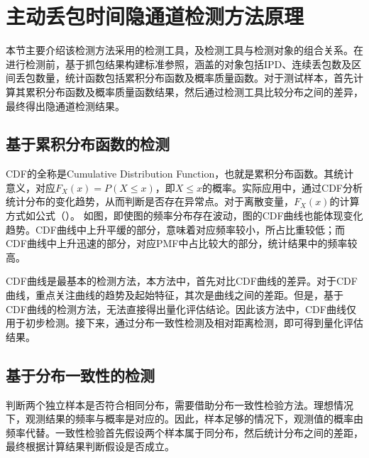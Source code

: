 \section{主动丢包时间隐通道检测方法原理}
\label{chap:analyze:statistical}

本节主要介绍该检测方法采用的检测工具，及检测工具与检测对象的组合关系。在进行检测前，基于抓包结果构建标准参照，涵盖的对象包括IPD、连续丢包数及区间丢包数量，统计函数包括累积分布函数及概率质量函数。对于测试样本，首先计算其累积分布函数及概率质量函数结果，然后通过检测工具比较分布之间的差异，最终得出隐通道检测结果。

\subsection{基于累积分布函数的检测}
\label{chap:analyze:statistical:cdf}

CDF的全称是Cumulative Distribution Function，也就是累积分布函数。其统计意义，对应$F_{X}(x)=P (X\leq x)$，即$X\leq x$的概率。实际应用中，通过CDF分析统计分布的变化趋势，从而判断是否存在异常点。对于离散变量，$F_{X}(x)$的计算方式如公式（）。
如图，即使图的频率分布存在波动，图的CDF曲线也能体现变化趋势。CDF曲线中上升平缓的部分，意味着对应频率较小，所占比重较低；而CDF曲线中上升迅速的部分，对应PMF中占比较大的部分，统计结果中的频率较高。

CDF曲线是最基本的检测方法，本方法中，首先对比CDF曲线的差异。对于CDF曲线，重点关注曲线的趋势及起始特征，其次是曲线之间的差距。但是，基于CDF曲线的检测方法，无法直接得出量化评估结论。因此该方法中，CDF曲线仅用于初步检测。接下来，通过分布一致性检测及相对距离检测，即可得到量化评估结果。

\subsection{基于分布一致性的检测}
\label{chap:analyze:statistical:test}

判断两个独立样本是否符合相同分布，需要借助分布一致性检验方法。理想情况下，观测结果的频率与概率是对应的。因此，样本足够的情况下，观测值的概率由频率代替。一致性检验首先假设两个样本属于同分布，然后统计分布之间的差距，最终根据计算结果判断假设是否成立。

